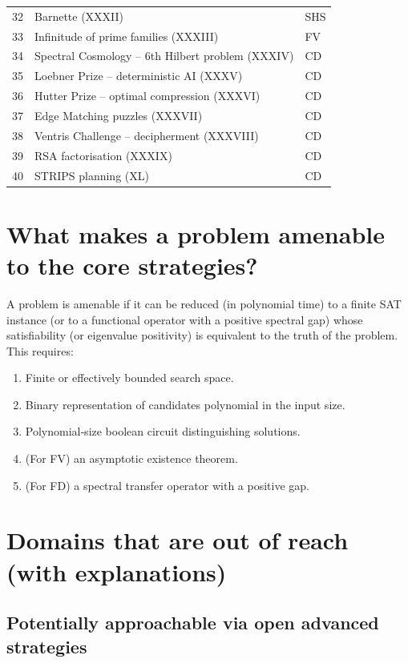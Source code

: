 \documentclass[11pt,a4paper]{article}
\begin{document}
\begin{center}
\begin{longtable}{@{}cll@{}}
32 & Barnette (XXXII) & SHS \\
33 & Infinitude of prime families (XXXIII) & FV \\
34 & Spectral Cosmology – 6th Hilbert problem (XXXIV) & CD \\
35 & Loebner Prize – deterministic AI (XXXV) & CD \\
36 & Hutter Prize – optimal compression (XXXVI) & CD \\
37 & Edge Matching puzzles (XXXVII) & CD \\
38 & Ventris Challenge – decipherment (XXXVIII) & CD \\
39 & RSA factorisation (XXXIX) & CD \\
40 & STRIPS planning (XL) & CD \\
\bottomrule
\end{longtable}
\end{center}

\section{What makes a problem amenable to the core strategies?}

A problem is amenable if it can be reduced (in polynomial time) to a finite SAT instance (or to a functional operator with a positive spectral gap) whose satisfiability (or eigenvalue positivity) is equivalent to the truth of the problem. This requires:

\begin{enumerate}
\item Finite or effectively bounded search space.
\item Binary representation of candidates polynomial in the input size.
\item Polynomial‑size boolean circuit distinguishing solutions.
\item (For FV) an asymptotic existence theorem.
\item (For FD) a spectral transfer operator with a positive gap.
\end{enumerate}

\section{Domains that are out of reach (with explanations)}

\subsection{Potentially approachable via open advanced strategies}
\end{document}
